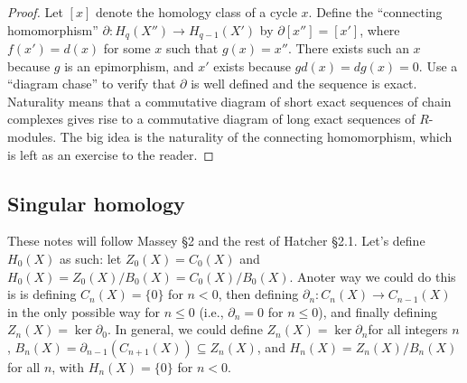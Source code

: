 \begin{proof}
    Let $[x]$ denote the homology class of a cycle $x$. Define the ``connecting homomorphism'' $\partial \colon H_q(X'') \to H_{q-1}(X')$ by $\partial [x'']=[x']$, where $f(x')=d(x)$ for some $x$ such that $g(x)=x''$. There exists such an $x$ because $g$ is an epimorphism, and $x'$ exists because $gd(x)=dg(x)=0$. Use a ``diagram chase'' to verify that $\partial $ is well defined and the sequence is exact. Naturality means that a commutative diagram of short exact sequences of chain complexes gives rise to a commutative diagram of long exact sequences of $R$-modules. The big idea is the naturality of the connecting homomorphism, which is left as an exercise to the reader.
\end{proof}

\subsection{Singular homology}
These notes will follow Massey \S 2 and the rest of Hatcher \S 2.1.
\orbreak
Let's define $H_0(X)$ as such: let $Z_0(X)=C_0(X)$ and  $H_0(X)=Z_0(X) / B_0(X)=C_0(X) /B_0(X)$. Anoter way we could do this is is defining $C_n (X)=\{0\} $ for $n<0$, then defining $\partial _n \colon C_n (X) \to C_{n-1}(X)$ in the only possible way for $n\leq 0$ (i.e., $\partial _n =0$ for $n\leq 0$), and finally defining $Z_n (X)=\ker \partial_0 $. In general, we could define $Z_n (X)=\ker \partial_n  $for all integers $n$, $B_n (X)=\partial _{n-1}(C_{n+1}(X))\subseteq Z_n (X)$, and $H_n (X)=Z_n (X) / B_n (X)$ for all $n$, with $H_n (X)=\{0\} $ for $n<0$.

